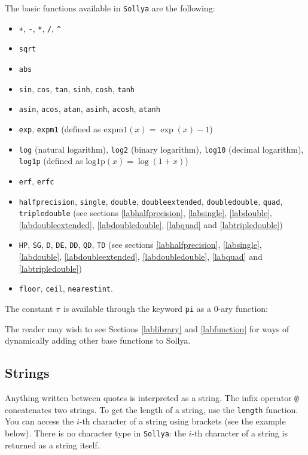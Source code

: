 \documentclass[a4paper]{article}
\newcommand{\com}[1]{\texttt{#1}}
\newcommand{\key}[1]{\texttt{#1}}
\newcommand{\sollya}{\texttt{Sollya}\xspace}
\begin{document}
The basic functions available in \sollya are the following:
\begin{itemize}
\item \com{+}, \com{-}, \com{*}, \com{/}, \com{\^{}}
\item \com{sqrt}
\item \com{abs}
\item \com{sin}, \com{cos}, \com{tan}, \com{sinh}, \com{cosh}, \com{tanh}
\item \com{asin}, \com{acos}, \com{atan}, \com{asinh}, \com{acosh}, \com{atanh}
\item \com{exp}, \com{expm1} (defined as $\mathrm{expm1}(x) = \exp(x)-1$)
\item \com{log} (natural logarithm), \com{log2} (binary logarithm), \com{log10} (decimal logarithm), \com{log1p} (defined as $\mathrm{log1p}(x) = \log(1+x)$)
\item \com{erf}, \com{erfc}
\item \com{halfprecision}, \com{single}, \com{double}, \com{doubleextended}, \com{doubledouble}, \com{quad}, \com{tripledouble} (see sections \ref{labhalfprecision}, \ref{labsingle}, \ref{labdouble}, \ref{labdoubleextended}, \ref{labdoubledouble}, \ref{labquad} and \ref{labtripledouble})
\item \com{HP}, \com{SG}, \com{D}, \com{DE}, \com{DD}, \com{QD}, \com{TD} (see sections \ref{labhalfprecision}, \ref{labsingle}, \ref{labdouble}, \ref{labdoubleextended}, \ref{labdoubledouble}, \ref{labquad} and \ref{labtripledouble})
\item \com{floor}, \com{ceil}, \com{nearestint}.
\end{itemize}

The constant $\pi$ is available through the keyword \key{pi} as a $0$-ary function: 



The reader may wish to see Sections \ref{lablibrary} and \ref{labfunction} for ways of dynamically adding other base functions to Sollya.

\subsection{Strings}
Anything written between quotes is interpreted as a string. The infix operator \com{@} concatenates two strings. To get the length of a string, use the \com{length} function. You can access the $i$-th character of a string using brackets (see the example below). There is no character type in \sollya: the $i$-th character of a string is returned as a string itself.
\end{document}
